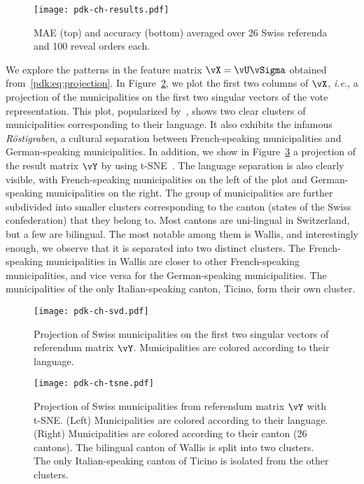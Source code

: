 \begin{figure}
	\centering
	\texttt{[image: pdk-ch-results.pdf]}
	\caption{MAE (top) and accuracy (bottom) averaged over 26 Swiss referenda and 100 reveal orders each.}
	\label{pdk:fig:ch_results}
\end{figure}

We explore the patterns in the feature matrix $\vX = \vU \vSigma$ obtained from~\eqref{pdk:eq:projection}.
In Figure~\ref{pdk:fig:ch_svd}, we plot the first two columns of $\vX$, \textit{i.e.}, a projection of the municipalities on the first two singular vectors of the vote representation.
This plot, popularized by~\citet{etter2014mining}, shows two clear clusters of municipalities corresponding to their language.
It also exhibits the infamous \textit{Röstigraben}, a cultural separation between French-speaking municipalities and German-speaking municipalities.
In addition, we show in Figure~\ref{pdk:fig:ch_tsne} a projection of the result matrix $\vY$ by using t-SNE~\citep{maaten2008visualizing}.
The language separation is also clearly visible, with French-speaking municipalities on the left of the plot and German-speaking municipalities on the right.
The group of municipalities are further subdivided into smaller clusters corresponding to the canton (states of the Swiss confederation) that they belong to.
Most cantons are uni-lingual in Switzerland, but a few are bilingual.
The most notable among them is Wallis, and interestingly enough, we observe that it is separated into two distinct clusters.
The French-speaking municipalities in Wallis are closer to other French-speaking municipalities, and vice versa for the German-speaking municipalities.
The municipalities of the only Italian-speaking canton, Ticino, form their own cluster.

\begin{figure}
	\centering
	\texttt{[image: pdk-ch-svd.pdf]}
	\caption{
		Projection of Swiss municipalities on the first two singular vectors of referendum matrix $\vY$.
		Municipalities are colored according to their language.
	}
	\label{pdk:fig:ch_svd}
\end{figure}

\begin{figure}
	\centering
	\texttt{[image: pdk-ch-tsne.pdf]}
	\caption{
		Projection of Swiss municipalities from referendum matrix $\vY$ with t-SNE.
		(Left) Municipalities are colored according to their language.
		(Right) Municipalities are colored according to their canton (26 cantons).
		The bilingual canton of Wallis is split into two clusters.
		The only Italian-speaking canton of Ticino is isolated from the other clusters.
	}
	\label{pdk:fig:ch_tsne}
\end{figure}

